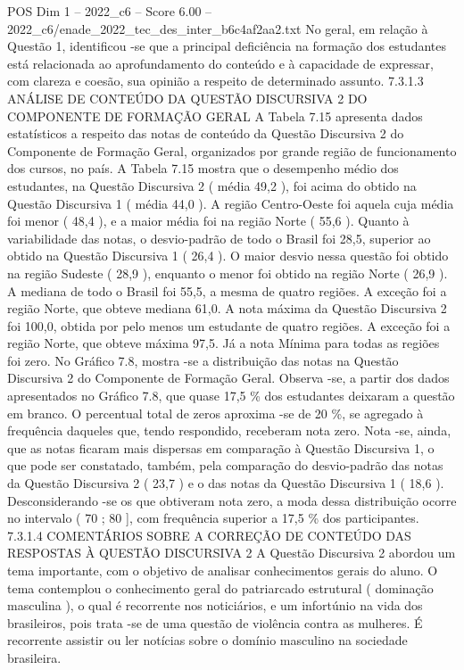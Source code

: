 \begin{textsample}{POS Dim 1 – 2022\_c6 – Score 6.00 – 2022\_c6/enade\_2022\_tec\_des\_inter\_b6c4af2aa2.txt}
No geral, em relação à Questão 1, identificou -se que a principal deficiência na formação dos estudantes está relacionada ao aprofundamento do conteúdo e à capacidade de expressar, com clareza e coesão, sua opinião a respeito de determinado assunto. 7.3.1.3 ANÁLISE DE CONTEÚDO DA QUESTÃO DISCURSIVA 2 DO COMPONENTE DE FORMAÇÃO GERAL A Tabela 7.15 apresenta dados estatísticos a respeito das notas de conteúdo da Questão Discursiva 2 do Componente de Formação Geral, organizados por grande região de funcionamento dos cursos, no país.
A Tabela 7.15 mostra que o desempenho médio dos estudantes, na Questão Discursiva 2 ( média 49,2 ), foi acima do obtido na Questão Discursiva 1 ( média 44,0 ).
A região Centro-Oeste foi aquela cuja média foi menor ( 48,4 ), e a maior média foi na região Norte ( 55,6 ).
Quanto à variabilidade das notas, o desvio-padrão de todo o Brasil foi 28,5, superior ao obtido na Questão Discursiva 1 ( 26,4 ).
O maior desvio nessa questão foi obtido na região Sudeste ( 28,9 ), enquanto o menor foi obtido na região Norte ( 26,9 ).
A mediana de todo o Brasil foi 55,5, a mesma de quatro regiões.
A exceção foi a região Norte, que obteve mediana 61,0.
A nota máxima da Questão Discursiva 2 foi 100,0, obtida por pelo menos um estudante de quatro regiões.
A exceção foi a região Norte, que obteve máxima 97,5.
Já a nota Mínima para todas as regiões foi zero.
No Gráfico 7.8, mostra -se a distribuição das notas na Questão Discursiva 2 do Componente de Formação Geral.
Observa -se, a partir dos dados apresentados no Gráfico 7.8, que quase 17,5 \% dos estudantes deixaram a questão em branco.
O percentual total de zeros aproxima -se de 20 \%, se agregado à frequência daqueles que, tendo respondido, receberam nota zero.
Nota -se, ainda, que as notas ficaram mais dispersas em comparação à Questão Discursiva 1, o que pode ser constatado, também, pela comparação do desvio-padrão das notas da Questão Discursiva 2 ( 23,7 ) e o das notas da Questão Discursiva 1 ( 18,6 ).
Desconsiderando -se os que obtiveram nota zero, a moda dessa distribuição ocorre no intervalo ( 70 ; 80 ], com frequência superior a 17,5 \% dos participantes. 7.3.1.4 COMENTÁRIOS SOBRE A CORREÇÃO DE CONTEÚDO DAS RESPOSTAS À QUESTÃO DISCURSIVA 2 A Questão Discursiva 2 abordou um tema importante, com o objetivo de analisar conhecimentos gerais do aluno.
O tema contemplou o conhecimento geral do patriarcado estrutural ( dominação masculina ), o qual é recorrente nos noticiários, e um infortúnio na vida dos brasileiros, pois trata -se de uma questão de violência contra as mulheres.
É recorrente assistir ou ler notícias sobre o domínio masculino na sociedade brasileira.

\end{textsample}
